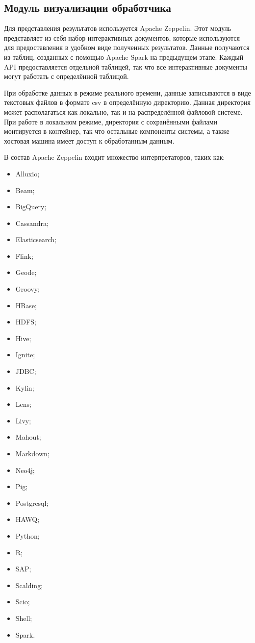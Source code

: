 \subsection{Модуль визуализации обработчика}
Для представления результатов используется Apache Zeppelin.
Этот модуль представляет из себя набор интерактивных документов, которые используются для предоставления в удобном виде полученных результатов.
Данные получаются из таблиц, созданных с помощью Apache Spark на предыдущем этапе.
Каждый API предоставляется отдельной таблицей, так что все интерактивные документы могут работать с определённой таблицой.

При обработке данных в режиме реального времени, данные записываются в виде текстовых файлов в формате csv в определённую директорию.
Данная директория может располагаться как локально, так и на распределённой файловой системе.
При работе в локальном режиме, директория с сохранёнными файлами монтируется в контейнер, так что остальные компоненты системы, а также хостовая машина имеет доступ к обработанным данным.

В состав Apache Zeppelin входит множество интерпретаторов, таких как:
\begin{itemize}
    \item Alluxio;
    \item Beam;
    \item BigQuery;
    \item Cassandra;
    \item Elasticsearch;
    \item Flink;
    \item Geode;
    \item Groovy;
    \item HBase;
    \item HDFS;
    \item Hive;
    \item Ignite;
    \item JDBC;
    \item Kylin;
    \item Lens;
    \item Livy;
    \item Mahout;
    \item Markdown;
    \item Neo4j;
    \item Pig;
    \item Postgresql;
    \item HAWQ;
    \item Python;
    \item R;
    \item SAP;
    \item Scalding;
    \item Scio;
    \item Shell;
    \item Spark.
\end{itemize}

